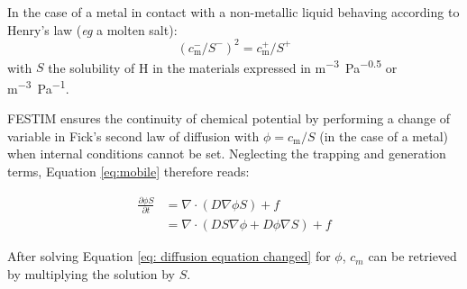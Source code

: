 In the case of a metal in contact with a non-metallic liquid behaving according to Henry's law (\textit{eg} a molten salt):
\begin{equation}
    (c_\mathrm{m}^-/S^-)^2 = c_\mathrm{m}^+/S^+
\end{equation}
with $S$ the solubility of H in the materials expressed in \si{m^{-3}.Pa^{-0.5}} or \si{m^{-3}.Pa^{-1}}.



FESTIM ensures the continuity of chemical potential by performing a change of variable in Fick's second law of diffusion with $\phi = c_\mathrm{m}/S$ (in the case of a metal)  when internal conditions cannot be set.
Neglecting the trapping and generation terms, Equation \ref{eq:mobile} therefore reads:

\begin{align}
    \frac{\partial \phi S}{\partial t} &= \nabla \cdot\left(D \nabla \phi S\right) + f \nonumber \\
    &=\nabla \cdot\left( D S \nabla \phi + D \phi \nabla S\right) + f \label{eq: diffusion equation changed}
\end{align}



After solving Equation \ref{eq: diffusion equation changed} for $\phi$, $c_m$ can be retrieved by multiplying the solution by $S$.

